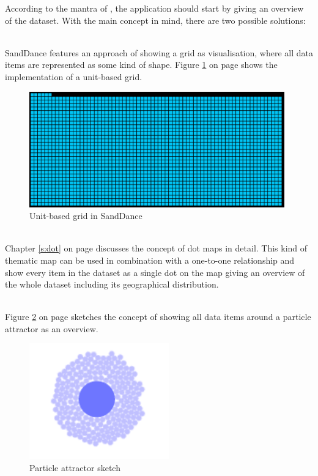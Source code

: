 According to the mantra of \citeauthor{Shneiderman1996}, the application should start by giving an overview of the dataset. With the main concept in mind, there are two possible solutions:
\begin{enumerate}

 \hfill \\
SandDance features an approach of showing a grid as visualisation, where all data items are represented as some kind of shape. Figure \ref{fig:sanddance-grid} on page \pageref{fig:sanddance-grid} shows the implementation of a unit-based grid.

\begin{figure}[!htb]
\centering
\includegraphics[height=5cm]{images/methods/related/sanddance-grid.png}
\caption[
    Unit-based grid in SandDance.
]{Unit-based grid in SandDance}
\label{fig:sanddance-grid}
\end{figure}

 \hfill \\
Chapter \ref{s:dot} on page \pageref{s:dot} discusses the concept of dot maps in detail. This kind of thematic map can be used in combination with a one-to-one relationship and show every item in the dataset as a single dot on the map giving an overview of the whole dataset including its geographical distribution.

 \hfill \\
Figure \ref{fig:particle-attractor} on page \pageref{fig:particle-attractor} sketches the concept of showing all data items around a particle attractor as an overview.

\begin{figure}[!htb]
\centering
\includegraphics[height=5cm]{images/methods/related/particle-attractor.png}
\caption[
    Particle attractor sketch.
]{Particle attractor sketch}
\label{fig:particle-attractor}
\end{figure}

\end{enumerate}

